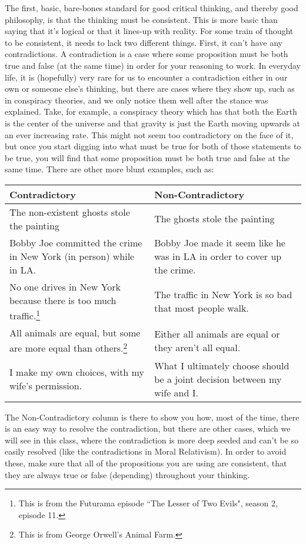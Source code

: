 The first, basic, bare-bones standard for good critical thinking, and thereby good philosophy, is that the thinking must be consistent. This is more basic than saying that it's logical or that it lines-up with reality. For some train of thought to be consistent, it needs to lack two different things. First, it can't have any contradictions. A contradiction is a case where some proposition must be both true and false (at the same time) in order for your reasoning to work. In everyday life, it is (hopefully) very rare for us to encounter a contradiction either in our own or someone else's thinking, but there are cases where they show up, such as in conspiracy theories, and we only notice them well after the stance was explained. Take, for example, a conspiracy theory which has that both the Earth is the center of the universe and that gravity is just the Earth moving upwards at an ever increasing rate. This might not seem too contradictory on the face of it, but once you start digging into what must be true for both of those statements to be true, you will find that some proposition must be both true and false at the same time. There are other more blunt examples, such as:

\begin{tabular}{p{2.5in}|p{2.5in}}
Contradictory &Non-Contradictory\\\hline
The non-existent ghosts stole the painting &The ghosts stole the painting\\\hline
Bobby Joe committed the crime in New York (in person) while in LA. &Bobby Joe made it seem like he was in LA in order to cover up the crime.\\\hline
No one drives in New York because there is too much traffic.\footnote{This is from the Futurama episode ``The Lesser of Two Evils", season 2, episode 11.} &The traffic in New York is so bad that most people walk.\\\hline
All animals are equal, but some are more equal than others.\footnote{This is from George Orwell's Animal Farm.} &Either all animals are equal or they aren't all equal.\\\hline
I make my own choices, with my wife's permission. &What I ultimately choose should be a joint decision between my wife and I.\\\hline
\end{tabular}

The Non-Contradictory column is there to show you how, most of the time, there is an easy way to resolve the contradiction, but there are other cases, which we will see in this class, where the contradiction is more deep seeded and can't be so easily resolved (like the contradictions in Moral Relativism). In order to avoid these, make sure that all of the propositions you are using are consistent, that they are always true or false (depending) throughout your thinking.

